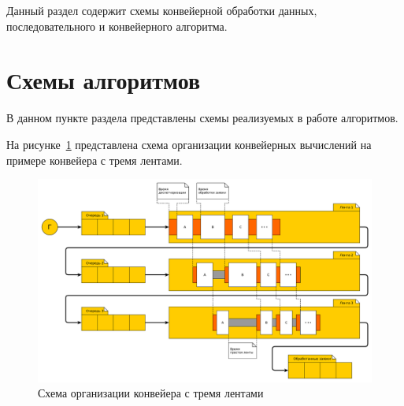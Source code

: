 \documentclass[../report.tex]{subfiles}
\begin{document}
Данный раздел содержит схемы конвейерной обработки данных, последовательного и конвейерного алгоритма.

\section{Схемы алгоритмов}
В данном пункте раздела представлены схемы реализуемых в работе алгоритмов.

На рисунке~\ref{img:conveer} представлена схема организации конвейерных вычислений на примере конвейера с тремя лентами.
\begin{figure}[H]
	\centering
	\includegraphics[width=1.00\linewidth]{images/conveer}
	\caption{Схема организации конвейера с тремя лентами}
	\label{img:conveer}
\end{figure}
\end{document}
